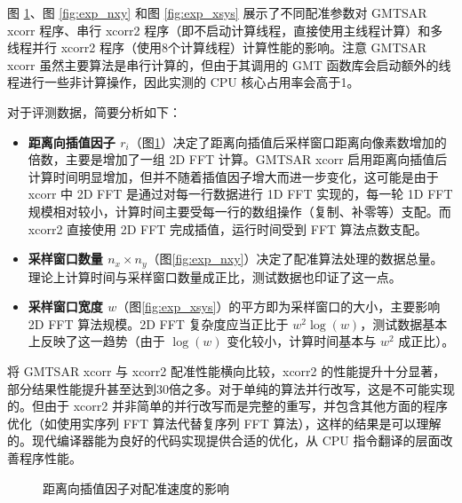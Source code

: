 图 \ref{fig:exp_ri}、图 \ref{fig:exp_nxy} 和图 \ref{fig:exp_xsys} 展示了不同配准参数对 GMTSAR xcorr 程序、串行 xcorr2 程序（即不启动计算线程，直接使用主线程计算）和多线程并行 xcorr2 程序（使用8个计算线程）计算性能的影响。注意 GMTSAR xcorr 虽然主要算法是串行计算的，但由于其调用的 GMT 函数库会启动额外的线程进行一些非计算操作，因此实测的 CPU 核心占用率会高于1。

对于评测数据，简要分析如下：
\begin{itemize}
    \item \textbf{距离向插值因子 $r_i$}（图\ref{fig:exp_ri}）决定了距离向插值后采样窗口距离向像素数增加的倍数，主要是增加了一组 2D FFT 计算。GMTSAR xcorr 启用距离向插值后计算时间明显增加，但并不随着插值因子增大而进一步变化，这可能是由于 xcorr 中 2D FFT 是通过对每一行数据进行 1D FFT 实现的，每一轮 1D FFT 规模相对较小，计算时间主要受每一行的数组操作（复制、补零等）支配。而 xcorr2 直接使用 2D FFT 完成插值，运行时间受到 FFT 算法点数支配。
    \item \textbf{采样窗口数量 $n_x \times n_y$}（图\ref{fig:exp_nxy}）决定了配准算法处理的数据总量。理论上计算时间与采样窗口数量成正比，测试数据也印证了这一点。
    \item \textbf{采样窗口宽度 $w$}（图\ref{fig:exp_xsys}）的平方即为采样窗口的大小，主要影响 2D FFT 算法规模。2D FFT 复杂度应当正比于 $w^2 \log(w)$，测试数据基本上反映了这一趋势（由于 $\log(w)$ 变化较小，计算时间基本与 $w^2$ 成正比）。
\end{itemize}

将 GMTSAR xcorr 与 xcorr2 配准性能横向比较，xcorr2 的性能提升十分显著，部分结果性能提升甚至达到30倍之多。对于单纯的算法并行改写，这是不可能实现的。但由于 xcorr2 并非简单的并行改写而是完整的重写，并包含其他方面的程序优化（如使用实序列 FFT 算法代替复序列 FFT 算法），这样的结果是可以理解的。现代编译器能为良好的代码实现提供合适的优化，从 CPU 指令翻译的层面改善程序性能。

\begin{figure}[htbp]
\centering
\subfloat[程序计算时间]{
    \label{fig:exp_ri_a}
    \begin{minipage}[t]{0.49\textwidth}
        \centering
        \resizebox {\textwidth} {!} {
            
        }
    \end{minipage}
}
\caption{距离向插值因子对配准速度的影响} \label{fig:exp_ri}
\end{figure}

